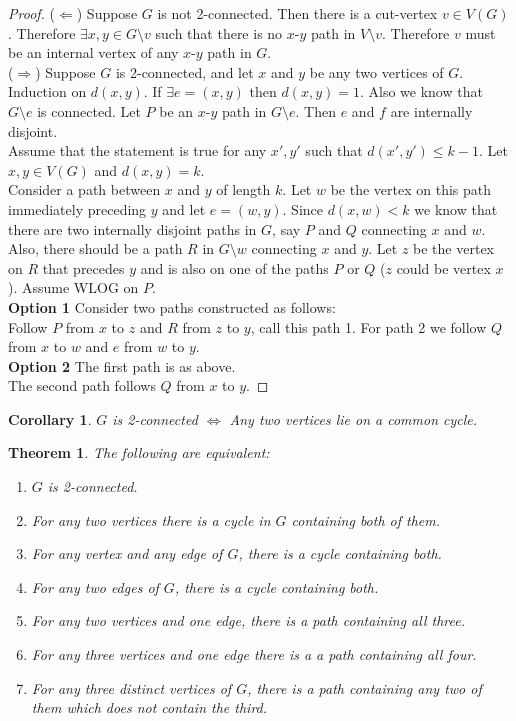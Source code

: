 \documentclass{article}
\newtheorem*{thm}{Theorem}
\newtheorem*{cor}{Corollary}
\theoremstyle{definition}
\begin{document}
\begin{proof}
($\Leftarrow$) Suppose $G$ is not 2-connected.
Then there is a cut-vertex $v\in V(G)$.
Therefore $\exists x,y\in G\setminus v$ such that there is no $x$-$y$ path in $V\setminus v$.
Therefore $v$ must be an internal vertex of any $x$-$y$ path in $G$. \\
($\Rightarrow$) Suppose $G$ is 2-connected, and let $x$ and $y$ be any two vertices of $G$.
Induction on $d(x,y)$.
If $\exists e=(x,y)$ then $d(x,y) = 1$.
Also we know that $G\setminus e$ is connected.
Let $P$ be an $x$-$y$ path in $G\setminus e$.
Then $e$ and $f$ are internally disjoint. \\
Assume that the statement is true for any $x',y'$ such that $d(x',y')\le k-1$.
Let $x,y\in V(G)$ and $d(x,y) = k$. \\
Consider a path between $x$ and $y$ of length $k$.
Let $w$ be the vertex on this path immediately preceding $y$ and let $e=(w,y)$.
Since $d(x,w)<k$ we know that there are two internally disjoint paths in $G$, say $P$ and $Q$ connecting $x$ and $w$.
Also, there should be a path $R$ in $G\setminus w$ connecting $x$ and $y$.
Let $z$ be the vertex on $R$ that precedes $y$ and is also on one of the paths $P$ or $Q$ ($z$ could be vertex $x$).
Assume WLOG on $P$. \\
\textbf{Option 1}
Consider two paths constructed as follows: \\
Follow $P$ from $x$ to $z$ and $R$ from $z$ to $y$, call this path 1.
For path 2 we follow $Q$ from $x$ to $w$ and $e$ from $w$ to $y$. \\
\textbf{Option 2}
The first path is as above. \\
The second path follows $Q$ from $x$ to $y$.
\end{proof}

\begin{cor}
$G$ is 2-connected $\iff$ Any two vertices lie on a common cycle.
\end{cor}

\begin{thm}
The following are equivalent:
\begin{enumerate}
\item $G$ is 2-connected.
\item For any two vertices there is a cycle in $G$ containing both of them.
\item For any vertex and any edge of $G$, there is a cycle containing both.
\item For any two edges of $G$, there is a cycle containing both.
\item For any two vertices and one edge, there is a path containing all three.
\item For any three vertices and one edge there is a a path containing all four.
\item For any three distinct vertices of $G$, there is a path containing any two of them which does not contain the third.
\end{enumerate}
\end{thm}
\end{document}
